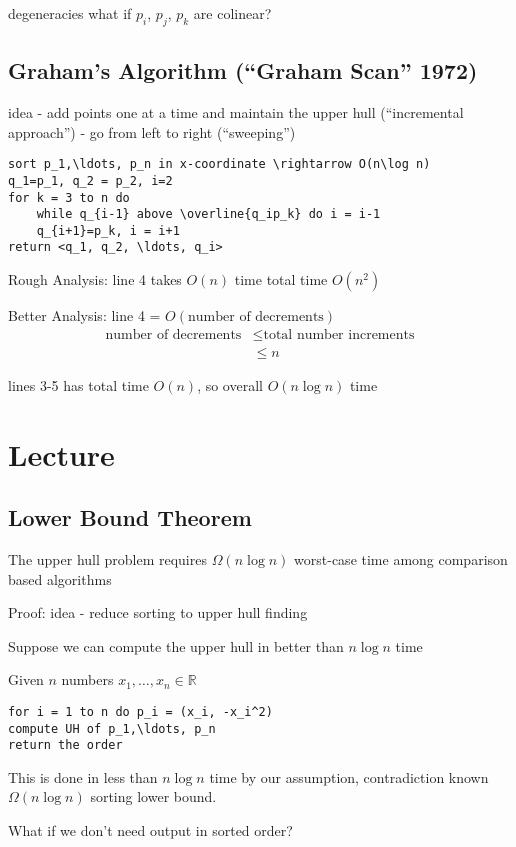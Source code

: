 \documentclass[english,12pt]{article}
\theoremstyle{plain}
\theoremstyle{definition}
\theoremstyle{definition} %
\begin{document}
degeneracies
what if $p_i$, $p_j$, $p_k$ are colinear?

\subsection{Graham's Algorithm (``Graham Scan'' 1972)}
idea - add points one at a time and maintain the upper hull (``incremental approach'')
- go from left to right (``sweeping'')

\begin{verbatim}
sort p_1,\ldots, p_n in x-coordinate \rightarrow O(n\log n) 
q_1=p_1, q_2 = p_2, i=2
for k = 3 to n do
    while q_{i-1} above \overline{q_ip_k} do i = i-1
    q_{i+1}=p_k, i = i+1
return <q_1, q_2, \ldots, q_i>
\end{verbatim} 

Rough Analysis:
line 4 takes $O(n)$ time
total time $O(n^2)$

Better Analysis:
line 4 = $O(\text{number of decrements})$
\begin{align*}
\text{number of decrements} &\le \text{total number increments}\\
&\le n
\end{align*}

lines 3-5 has total time $O(n)$, so overall $O(n\log n)$ time

\section{Lecture}
\subsection{Lower Bound Theorem}
The upper hull problem requires $\Omega(n\log n)$ worst-case time among comparison based algorithms

Proof: idea - reduce sorting to upper hull finding

Suppose we can compute the upper hull in better than $n\log n$ time

Given $n$ numbers $x_1,\ldots, x_n\in\mathbb{R}$
\begin{verbatim}
for i = 1 to n do p_i = (x_i, -x_i^2)
compute UH of p_1,\ldots, p_n
return the order
\end{verbatim}

This is done in less than $n\log n$ time by our assumption, contradiction known $\Omega(n\log n)$ sorting lower bound.

What if we don't need output in sorted order?
\end{document}
